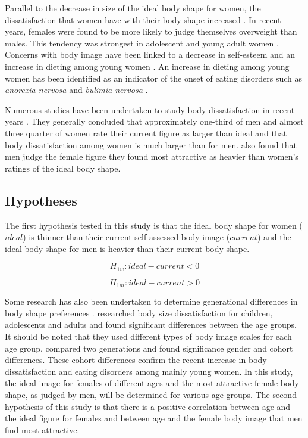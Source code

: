 \documentclass[a4paper, jou, 11pt]{apa6}
\begin{document}
Parallel to the decrease in size of the ideal body shape for women, the dissatisfaction that women have with their body shape increased \cite{cash_how_2004}. In recent years, females were found to be more likely to judge themselves overweight than males. This tendency was strongest in adolescent and young adult women \cite{fallon_sex_1985,tiggeman_development_1990,tiggeman_body-size_1992}. Concerns with body image have been linked to a decrease in self-esteem and an increase in dieting among young women \cite{hill_eating_1992}. An increase in dieting among young women has been identified as an indicator of the onset of eating disorders such as \emph{anorexia nervosa} and \emph{bulimia nervosa} \cite{barker_body_2003,fear_prevalence_1996,lamb_body_1993}.

Numerous studies have been undertaken to study body dissatisfaction in recent years \cite{fallon_sex_1985,tiggeman_development_1990,tiggeman_body-size_1992,lamb_body_1993,abel_relationship_1996,byrne_should_1996,fear_prevalence_1996,cash_how_2004}. They generally concluded that approximately one-third of men and almost three quarter of women rate their current figure as larger than ideal and that body dissatisfaction among women is much larger than for men.  also found that men judge the female figure they found most attractive as heavier than women's ratings of the ideal body shape.
\subsection{Hypotheses}
\label{sec:org22c6220}
The first hypothesis tested in this study is that the ideal body shape for women (\(ideal\)) is thinner than their current self-assessed body image (\(current\)) and the ideal body shape for men is heavier than their current body shape.

$$H_{1w}: ideal - current < 0 $$

$$H_{1m}: ideal - current > 0 $$

Some research has also been undertaken to determine generational differences in body shape preferences \cite{lamb_body_1993}.  researched body size dissatisfaction for children, adolescents and adults and found significant differences between the age groups. It should be noted that they used different types of body image scales for each age group.  compared two generations and found significance gender and cohort differences. These cohort differences confirm the recent increase in body dissatisfaction and eating disorders among mainly young women. In this study, the ideal image for females of different ages and the most attractive female body shape, as judged by men, will be determined for various age groups. The second hypothesis of this study is that there is a positive correlation between age and the ideal figure for females and between age and the female body image that men find most attractive.
\end{document}
